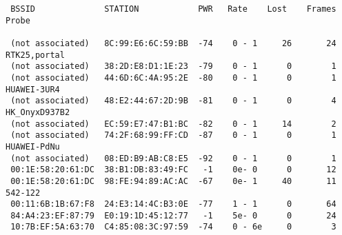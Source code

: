 \documentclass[10pt,a4paper]{report}
\begin{document}
\begin{lstlisting}
 BSSID              STATION            PWR   Rate    Lost    Frames  Probe                                                                      
                                                                                                                                                
 (not associated)   8C:99:E6:6C:59:BB  -74    0 - 1     26       24  RTK25,portal                                                               
 (not associated)   38:2D:E8:D1:1E:23  -79    0 - 1      0        1                                                                             
 (not associated)   44:6D:6C:4A:95:2E  -80    0 - 1      0        1  HUAWEI-3UR4                                                                
 (not associated)   48:E2:44:67:2D:9B  -81    0 - 1      0        4  HK_OnyxD937B2                                                              
 (not associated)   EC:59:E7:47:B1:BC  -82    0 - 1     14        2                                                                             
 (not associated)   74:2F:68:99:FF:CD  -87    0 - 1      0        1  HUAWEI-PdNu                                                                
 (not associated)   08:ED:B9:AB:C8:E5  -92    0 - 1      0        1                                                                             
 00:1E:58:20:61:DC  38:B1:DB:83:49:FC   -1    0e- 0      0       12                                                                             
 00:1E:58:20:61:DC  98:FE:94:89:AC:AC  -67    0e- 1     40       11  542-122                                                                    
 00:11:6B:1B:67:F8  24:E3:14:4C:B3:0E  -77    1 - 1      0       64                                                                             
 84:A4:23:EF:87:79  E0:19:1D:45:12:77   -1    5e- 0      0       24                                                                             
 10:7B:EF:5A:63:70  C4:85:08:3C:97:59  -74    0 - 6e     0        3            

		\end{lstlisting}
		
\end{document}
